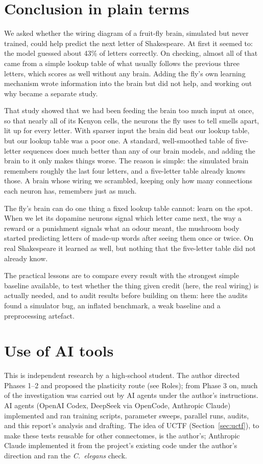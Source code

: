 \documentclass[conference]{IEEEtran}
\begin{document}
\section{Conclusion in plain terms}
We asked whether the wiring diagram of a fruit-fly brain, simulated but never
trained, could help predict the next letter of Shakespeare. At first it seemed
to: the model guessed about 43\% of letters correctly. On checking, almost all
of that came from a simple lookup table of what usually follows the previous
three letters, which scores as well without any brain. Adding the fly's own
learning mechanism wrote information into the brain but did not help, and
working out why became a separate study.

That study showed that we had been feeding the brain too much input at once,
so that nearly all of its Kenyon cells, the neurons the fly uses to tell smells
apart, lit up for every letter. With sparser input the brain did beat our
lookup table, but our lookup table was a poor one. A standard, well-smoothed
table of five-letter sequences does much better than any of our brain models,
and adding the brain to it only makes things worse. The reason is simple: the
simulated brain remembers roughly the last four letters, and a five-letter
table already knows those. A brain whose wiring we scrambled, keeping only how
many connections each neuron has, remembers just as much.

The fly's brain can do one thing a fixed lookup table cannot: learn on the
spot. When we let its dopamine neurons signal which letter came next, the way
a reward or a punishment signals what an odour meant, the mushroom body
started predicting letters of made-up words after seeing them once or twice.
On real Shakespeare it learned as well, but nothing that the five-letter table
did not already know.

The practical lessons are to compare every result with the strongest simple
baseline available, to test whether the thing given credit (here, the real
wiring) is actually needed, and to audit results before building on them: here
the audits found a simulator bug, an inflated benchmark, a weak baseline and a
preprocessing artefact.

\section*{Use of AI tools}
This is independent research by a high-school student. The author directed
Phases 1--2 and proposed the plasticity route (see Roles); from Phase 3 on,
much of the investigation was carried out by AI agents under the author's
instructions. AI agents (OpenAI Codex, DeepSeek via OpenCode, Anthropic Claude)
implemented and ran training scripts, parameter sweeps, parallel runs, audits,
and this report's analysis and drafting. The idea of UCTF
(Section~\ref{sec:uctf}), to make these tests reusable for other connectomes,
is the author's; Anthropic Claude implemented it from the project's existing
code under the author's direction and ran the \textit{C.~elegans} check.
\end{document}
